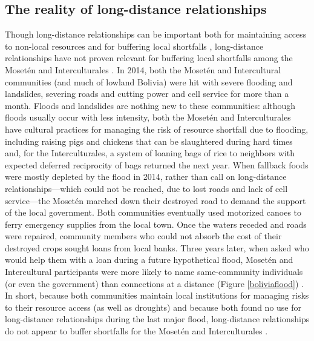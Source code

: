\documentclass[bibauthoryear]{aa}
\begin{document}
	\subsection{The reality of long-distance relationships}\label{distance}
	Though long-distance relationships can be important both for maintaining access to non-local resources and for buffering local shortfalls \citep{pisor2019evolution}, long-distance relationships have not proven relevant for buffering local shortfalls among the Moset\'en and Interculturales \citep{pisorjones2020}. In 2014, both the Moset\'en and Intercultural communities (and much of lowland Bolivia) were hit with severe flooding and landslides, severing roads and cutting power and cell service for more than a month. Floods and landslides are nothing new to these communities: although floods usually occur with less intensity, both the Moset\'en and Interculturales have cultural practices for managing the risk of resource shortfall due to flooding, including raising pigs and chickens that can be slaughtered during hard times and, for the Interculturales, a system of loaning bags of rice to neighbors with expected deferred reciprocity of bags returned the next year. When fallback foods were mostly depleted by the flood in 2014, rather than call on long-distance relationships---which could not be reached, due to lost roads and lack of cell service---the Moset\'en marched down their destroyed road to demand the support of the local government. Both communities eventually used motorized canoes to ferry emergency supplies from the local town. Once the waters receded and roads were repaired, community members who could not absorb the cost of their destroyed crops sought loans from local banks. Three years later, when asked who would help them with a loan during a future hypothetical flood, Moset\'en and Intercultural participants were more likely to name same-community individuals (or even the government) than connections at a distance (Figure \ref{boliviaflood}) \citep{pisorjones2020}. In short, because both communities maintain local institutions for managing risks to their resource access (as well as droughts) and because both found no use for long-distance relationships during the last major flood, long-distance relationships do not appear to buffer shortfalls for the Moset\'en and Interculturales \citep{pisorjones2020}.
\end{document}
